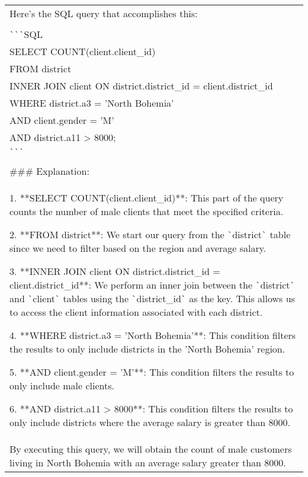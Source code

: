 \begin{table*}[htbp]
\begin{tcolorbox}[
    colback=white, %
    colframe=black, %
    title=Response, %
    fonttitle=\bfseries, %
    width=\textwidth, %
    boxrule=1pt, %
    rounded corners, %
]
\begin{tabularx}{\textwidth}{X}
Here's the SQL query that accomplishes this: \\ \\

\verb|`|\verb|`|\verb|`|SQL \\
SELECT COUNT(client.client\_id) \\
FROM district \\
INNER JOIN client ON district.district\_id = client.district\_id \\
WHERE district.a3 = 'North Bohemia' \\ 
AND client.gender = 'M' \\ 
AND district.a11 > 8000; \\ 
\verb|`|\verb|`|\verb|`| \\ \\ 

\#\#\# Explanation: \\
1. **SELECT COUNT(client.client\_id)**: This part of the query counts the number of male clients that meet the specified criteria. 
  
2. **FROM district**: We start our query from the \verb|`|district\verb|`| table since we need to filter based on the region and average salary.

3. **INNER JOIN client ON district.district\_id = client.district\_id**: We perform an inner join between the \verb|`|district\verb|`| and \verb|`|client\verb|`| tables using the \verb|`|district\_id\verb|`| as the key. This allows us to access the client information associated with each district.

4. **WHERE district.a3 = 'North Bohemia'**: This condition filters the results to only include districts in the 'North Bohemia' region.

5. **AND client.gender = 'M'**: This condition filters the results to only include male clients.

6. **AND district.a11 > 8000**: This condition filters the results to only include districts where the average salary is greater than 8000.

\\
By executing this query, we will obtain the count of male customers living in North Bohemia with an average salary greater than 8000.

\end{tabularx}
\end{tcolorbox}
\caption{The full response Syn CoT SFT Qwen2.5-7B-Instruct generated for a sample question from Bird Dev. \textbf{The response is wrong due to entity mismatch for the region 'north Bohemia'}.}
\label{tab:cotResponseSFT}
\end{table*}